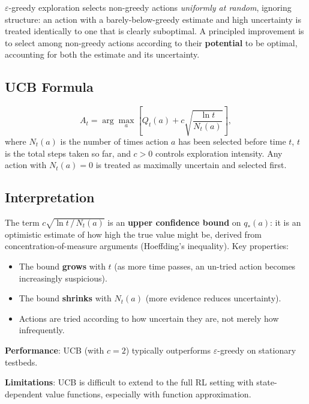 \documentclass[11pt,a4paper]{article}
\theoremstyle{definition}
\theoremstyle{plain}
\theoremstyle{remark}
\begin{document}
$\varepsilon$-greedy exploration selects non-greedy actions \emph{uniformly at random}, ignoring structure: an action with a barely-below-greedy estimate and high uncertainty is treated identically to one that is clearly suboptimal. A principled improvement is to select among non-greedy actions according to their \textbf{potential} to be optimal, accounting for both the estimate and its uncertainty.

\subsection{UCB Formula}

\begin{tcolorbox}[colback=blue!5!white,colframe=blue!75!black,title=\textbf{UCB Action Selection}]
\[
    A_t = \arg\max_a \left[Q_t(a) + c\sqrt{\frac{\ln t}{N_t(a)}}\right],
\]
where $N_t(a)$ is the number of times action $a$ has been selected before time $t$, $t$ is the total steps taken so far, and $c > 0$ controls exploration intensity. Any action with $N_t(a) = 0$ is treated as maximally uncertain and selected first.
\end{tcolorbox}

\subsection{Interpretation}

The term $c\sqrt{\ln t\,/\,N_t(a)}$ is an \textbf{upper confidence bound} on $q_*(a)$: it is an optimistic estimate of how high the true value might be, derived from concentration-of-measure arguments (Hoeffding's inequality). Key properties:

\begin{itemize}
    \item The bound \textbf{grows} with $t$ (as more time passes, an un-tried action becomes increasingly suspicious).
    \item The bound \textbf{shrinks} with $N_t(a)$ (more evidence reduces uncertainty).
    \item Actions are tried according to how uncertain they are, not merely how infrequently.
\end{itemize}

\textbf{Performance}: UCB (with $c = 2$) typically outperforms $\varepsilon$-greedy on stationary testbeds.

\textbf{Limitations}: UCB is difficult to extend to the full RL setting with state-dependent value functions, especially with function approximation.
\end{document}
